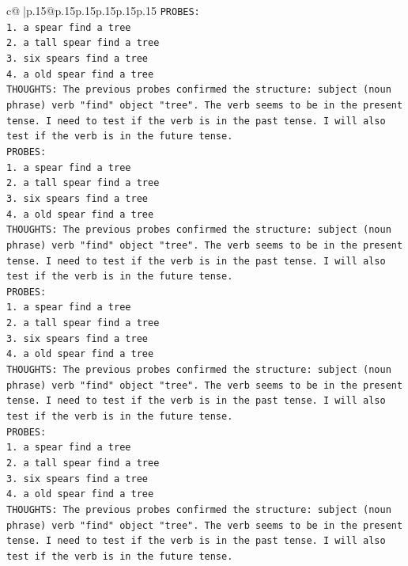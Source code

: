 \documentclass{article}
\begin{document}
{\begin{supertabular}{c@{$\;$}|p{.15\linewidth}@{}p{.15\linewidth}p{.15\linewidth}p{.15\linewidth}p{.15\linewidth}p{.15\linewidth}}
{{{\texttt{PROBES:} \\
\texttt{1. a spear find a tree} \\
\texttt{2. a tall spear find a tree} \\
\texttt{3. six spears find a tree} \\
\texttt{4. a old spear find a tree} \\
\texttt{THOUGHTS: The previous probes confirmed the structure: subject (noun phrase) verb "find" object "tree". The verb seems to be in the present tense. I need to test if the verb is in the past tense. I will also test if the verb is in the future tense.} \\
\texttt{PROBES:} \\
\texttt{1. a spear find a tree} \\
\texttt{2. a tall spear find a tree} \\
\texttt{3. six spears find a tree} \\
\texttt{4. a old spear find a tree} \\
\texttt{THOUGHTS: The previous probes confirmed the structure: subject (noun phrase) verb "find" object "tree". The verb seems to be in the present tense. I need to test if the verb is in the past tense. I will also test if the verb is in the future tense.} \\
\texttt{PROBES:} \\
\texttt{1. a spear find a tree} \\
\texttt{2. a tall spear find a tree} \\
\texttt{3. six spears find a tree} \\
\texttt{4. a old spear find a tree} \\
\texttt{THOUGHTS: The previous probes confirmed the structure: subject (noun phrase) verb "find" object "tree". The verb seems to be in the present tense. I need to test if the verb is in the past tense. I will also test if the verb is in the future tense.} \\
\texttt{PROBES:} \\
\texttt{1. a spear find a tree} \\
\texttt{2. a tall spear find a tree} \\
\texttt{3. six spears find a tree} \\
\texttt{4. a old spear find a tree} \\
\texttt{THOUGHTS: The previous probes confirmed the structure: subject (noun phrase) verb "find" object "tree". The verb seems to be in the present tense. I need to test if the verb is in the past tense. I will also test if the verb is in the future tense.} \\
}}}
\end{supertabular}}
\end{document}
